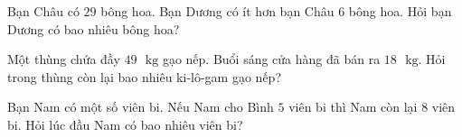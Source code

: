\begin{bt}[1,5 điểm]
Bạn Châu có $29$ bông hoa. Bạn Dương có ít hơn bạn Châu $6$ bông hoa. Hỏi bạn Dương có bao nhiêu bông hoa?
\end{bt}

\begin{bt}[1,0 điểm]
Một thùng chứa đầy $49\text{ }\text{kg}$ gạo nếp. Buổi sáng cửa hàng đã bán ra $18\text{ }\text{kg}$. Hỏi trong thùng còn lại bao nhiêu ki-lô-gam gạo nếp?
\end{bt}

\begin{bt}[1,0 điểm]
Bạn Nam có một số viên bi. Nếu Nam cho Bình $5$ viên bi thì Nam còn lại $8$ viên bi. Hỏi lúc đầu Nam có bao nhiêu viên bi?
\end{bt}
